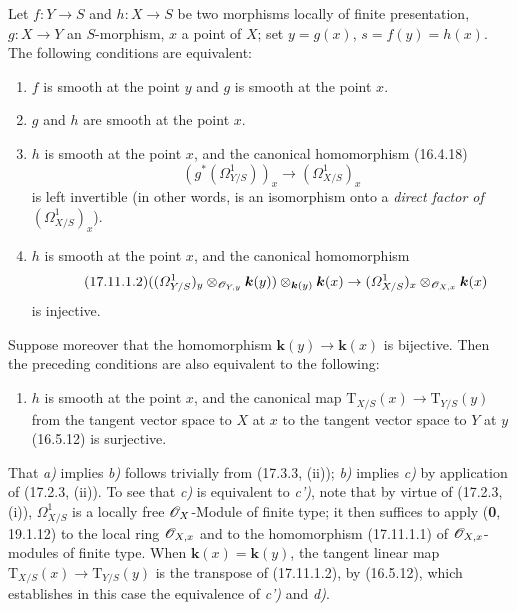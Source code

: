 \begin{theorem}[17.11.1]
\label{IV.17.11.1}
Let $f:Y\to S$ and $h:X\to S$ be two morphisms locally of finite presentation, $g:X\to Y$ an $S$-morphism, $x$ a point of $X$; set $y=g(x)$, $s=f(y)=h(x)$. The following conditions are equivalent:
\begin{enumerate}
  \item[\textup{a)}] $f$ is smooth at the point $y$ and $g$ is smooth at the point $x$.
  \item[\textup{b)}] $g$ and $h$ are smooth at the point $x$.
  \item[\textup{c)}] $h$ is smooth at the point $x$, and the canonical homomorphism \textup{(16.4.18)}
  \begin{equation}
  \label{IV.17.11.1.1}
  \tag{17.11.1.1}
  (g^*(\varOmega^1_{Y/S}))_x\to(\varOmega^1_{X/S})_x
  \end{equation}
  is left invertible \textup{(in other words, is an isomorphism onto a \emph{direct factor of} $(\varOmega^1_{X/S})_x$)}.
  \item[\textup{c$'$)}] $h$ is smooth at the point $x$, and the canonical homomorphism
  \begin{equation}
  \label{IV.17.11.1.2}
  \tag{17.11.1.2}
  ((\varOmega^1_{Y/S})_y\otimes_{\mathscr{O}_{Y,y}}\boldsymbol{k}(y))\otimes_{\boldsymbol{k}(y)}\boldsymbol{k}(x)\to(\varOmega^1_{X/S})_x\otimes_{\mathscr{O}_{X,x}}\boldsymbol{k}(x)
  \end{equation}
  is injective.
\end{enumerate}
Suppose moreover that the homomorphism $\boldsymbol{k}(y)\to\boldsymbol{k}(x)$ is bijective. Then the preceding conditions are also equivalent to the following:
\begin{enumerate}
  \item[\textup{d)}] $h$ is smooth at the point $x$, and the canonical map $\mathrm{T}_{X/S}(x)\to\mathrm{T}_{Y/S}(y)$ from the tangent vector space to $X$ at $x$ to the tangent vector space to $Y$ at $y$ \textup{(16.5.12)} is surjective.
\end{enumerate}
\end{theorem}

That \emph{a)} implies \emph{b)} follows trivially from (17.3.3, (ii)); \emph{b)} implies \emph{c)} by application of (17.2.3, (ii)). To see that \emph{c)} is equivalent to \emph{c')}, note that by virtue of (17.2.3, (i)), $\varOmega^1_{X/S}$ is a locally free $\mathscr{O}_X$-Module of finite type; it then suffices to apply (\textbf{0}, 19.1.12) to the local ring $\mathscr{O}_{X,x}$ and to the homomorphism (17.11.1.1) of $\mathscr{O}_{X,x}$-modules of finite type. When $\boldsymbol{k}(x)=\boldsymbol{k}(y)$, the tangent linear map $\mathrm{T}_{X/S}(x)\to\mathrm{T}_{Y/S}(y)$ is the transpose of (17.11.1.2), by (16.5.12), which establishes in this case the equivalence of \emph{c')} and \emph{d)}.


